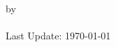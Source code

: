 \begin{titlepage}
	\setcounter{page}{1}
	\onehalfspacing
	\vspace{4em}
	\vspace*{\fill}
    \begin{center}
        \textbf{\CAPTitle}\\
		\vspace{2em}
		by\\
        \Author \\  
      	\vspace{2em}
		Last Update: \today
    \end{center}
	\vspace*{\fill}
\end{titlepage}